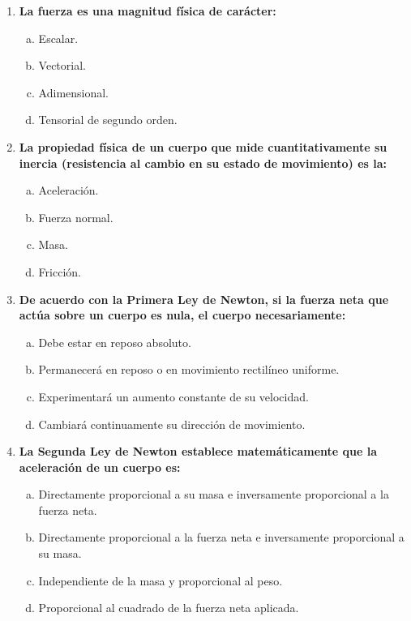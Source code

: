 \documentclass[11pt,a4paper]{article}
\begin{document}
\begin{enumerate}
    \item \textbf{La fuerza es una magnitud física de carácter:}
    \begin{enumerate}[a)]
        \item Escalar.
        \item Vectorial.
        \item Adimensional.
        \item Tensorial de segundo orden.
    \end{enumerate}

    \item \textbf{La propiedad física de un cuerpo que mide cuantitativamente su inercia (resistencia al cambio en su estado de movimiento) es la:}
    \begin{enumerate}[a)]
        \item Aceleración.
        \item Fuerza normal.
        \item Masa.
        \item Fricción.
    \end{enumerate}

    \item \textbf{De acuerdo con la Primera Ley de Newton, si la fuerza neta que actúa sobre un cuerpo es nula, el cuerpo necesariamente:}
    \begin{enumerate}[a)]
        \item Debe estar en reposo absoluto.
        \item Permanecerá en reposo o en movimiento rectilíneo uniforme.
        \item Experimentará un aumento constante de su velocidad.
        \item Cambiará continuamente su dirección de movimiento.
    \end{enumerate}

    \item \textbf{La Segunda Ley de Newton establece matemáticamente que la aceleración de un cuerpo es:}
    \begin{enumerate}[a)]
        \item Directamente proporcional a su masa e inversamente proporcional a la fuerza neta.
        \item Directamente proporcional a la fuerza neta e inversamente proporcional a su masa.
        \item Independiente de la masa y proporcional al peso.
        \item Proporcional al cuadrado de la fuerza neta aplicada.
    \end{enumerate}

\end{enumerate}
\end{document}
